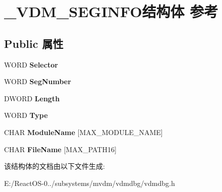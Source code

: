 \hypertarget{struct___v_d_m___s_e_g_i_n_f_o}{}\section{\+\_\+\+V\+D\+M\+\_\+\+S\+E\+G\+I\+N\+F\+O结构体 参考}
\label{struct___v_d_m___s_e_g_i_n_f_o}
\subsection*{Public 属性}
\begin{DoxyCompactItemize}
\item 
\mbox{\label{struct___v_d_m___s_e_g_i_n_f_o_abcaa18f70575c4b6e5682709ac16bcac}} 
W\+O\+RD {\bfseries Selector}
\item 
\mbox{\label{struct___v_d_m___s_e_g_i_n_f_o_a22ffb605ea211fc4853f5556962ee63b}} 
W\+O\+RD {\bfseries Seg\+Number}
\item 
\mbox{\label{struct___v_d_m___s_e_g_i_n_f_o_a7f0db7fd618413c61aefc4aed721a958}} 
D\+W\+O\+RD {\bfseries Length}
\item 
\mbox{\label{struct___v_d_m___s_e_g_i_n_f_o_a96b12c293abade1418d38eac246304de}} 
W\+O\+RD {\bfseries Type}
\item 
\mbox{\label{struct___v_d_m___s_e_g_i_n_f_o_a41d7707d5de4d2c8305caca1882e6e96}} 
C\+H\+AR {\bfseries Module\+Name} \mbox{[}M\+A\+X\+\_\+\+M\+O\+D\+U\+L\+E\+\_\+\+N\+A\+ME\mbox{]}
\item 
\mbox{\label{struct___v_d_m___s_e_g_i_n_f_o_aee7572c4d37b8a86ffbb90b6cd073ebd}} 
C\+H\+AR {\bfseries File\+Name} \mbox{[}M\+A\+X\+\_\+\+P\+A\+T\+H16\mbox{]}
\end{DoxyCompactItemize}


该结构体的文档由以下文件生成\+:\begin{DoxyCompactItemize}
\item 
E\+:/\+React\+O\+S-\/0../subsystems/mvdm/vdmdbg/vdmdbg.\+h\end{DoxyCompactItemize}
